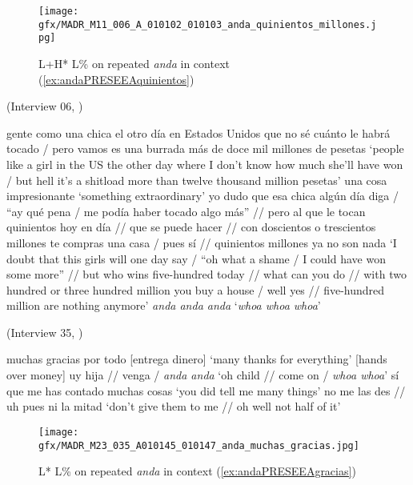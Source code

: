 \begin{figure}
	\texttt{[image: gfx/MADR\_M11\_006\_A\_010102\_010103\_anda\_quinientos\_millones.jpg]}
	\caption{L+H* L\% on repeated \textit{anda} in context (\ref{ex:andaPRESEEAquinientos}) \href{https://osf.io/ptc69/}{\faVolumeUp} \label{fig:andaPRESEEAquinientos}}
\end{figure}

\begin{exe}
	\ex (Interview 06, \cite{PRESEEA.20142020})\label{ex:andaPRESEEAquinientos}
	\begin{xlist}[A:]
	 gente como una chica el otro día en Estados Unidos que no sé cuánto le habrá tocado / pero vamos es una burrada más de doce mil millones de pesetas  
	\glt `people like a girl in the US the other day where I don't know how much she'll have won / but hell it's a shitload more than twelve thousand million pesetas' 
	 una cosa impresionante  
	\glt `something extraordinary' 
	 yo dudo que esa chica algún día diga / ``ay qué pena / me podía haber tocado algo más'' // pero al que le tocan quinientos hoy en día // que se puede hacer // con doscientos o trescientos millones te compras una casa / pues sí // quinientos millones ya no son nada   
	\glt `I doubt that this girls will one day say / ``oh what a shame / I could have won some more'' // but who wins five-hundred today // what can you do // with two hundred or three hundred million you buy a house / well yes // five-hundred million are nothing anymore' 
	 \textit{anda anda anda} 
	\glt `\textit{whoa whoa whoa}'
	\end{xlist}

\ex (Interview 35, \cite{PRESEEA.20142020})\label{ex:andaPRESEEAgracias}
	\begin{xlist}[A:]
	  muchas gracias por todo \hfill [entrega dinero] 
	\glt `many thanks for everything' \hfill [hands over money]
	  uy hija // venga / \textit{anda anda} 
	\glt `oh child // come on / \textit{whoa whoa}' 
	  sí que me has contado muchas cosas 
	\glt `{you did tell me many things}' 
	  no me las des // uh pues ni la mitad 
	\glt `don't give them to me // oh well not half of it' 
	\end{xlist}
\end{exe}

\begin{figure}
	\texttt{[image: gfx/MADR\_M23\_035\_A010145\_010147\_anda\_muchas\_gracias.jpg]}
	\caption[L* L\% on repeated \textit{anda} in context (\ref{ex:andaPRESEEAgracias})]{L* L\% on repeated  \textit{anda} in context (\ref{ex:andaPRESEEAgracias}) \href{https://osf.io/cjbev/}{\faVolumeUp} \label{fig:andaPRESEEAgracias}}
\end{figure}

